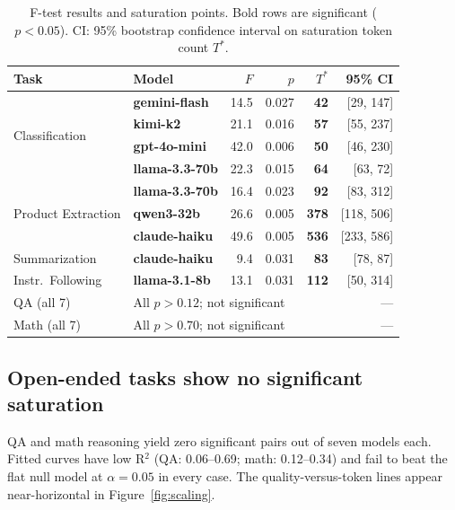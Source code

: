 \begin{table}[t]
\centering
\caption{F-test results and saturation points. Bold rows are significant ($p < 0.05$).
  CI: 95\% bootstrap confidence interval on saturation token count $T^*$.}
\label{tab:ftest}
\small
\begin{tabular}{llrrrr}
\toprule
Task & Model & $F$ & $p$ & $T^*$ & 95\% CI \\
\midrule
\multirow{4}{*}{Classification}
  & \textbf{gemini-flash}  & 14.5 & 0.027 & \textbf{42}  & [29, 147]  \\
  & \textbf{kimi-k2}       & 21.1 & 0.016 & \textbf{57}  & [55, 237]  \\
  & \textbf{gpt-4o-mini}   & 42.0 & 0.006 & \textbf{50}  & [46, 230]  \\
  & \textbf{llama-3.3-70b} & 22.3 & 0.015 & \textbf{64}  & [63, 72]   \\
\midrule
\multirow{3}{*}{Product Extraction}
  & \textbf{llama-3.3-70b} & 16.4 & 0.023 & \textbf{92}  & [83, 312]  \\
  & \textbf{qwen3-32b}     & 26.6 & 0.005 & \textbf{378} & [118, 506] \\
  & \textbf{claude-haiku}  & 49.6 & 0.005 & \textbf{536} & [233, 586] \\
\midrule
Summarization      & \textbf{claude-haiku}  &  9.4 & 0.031 & \textbf{83}  & [78, 87]   \\
Instr.\ Following  & \textbf{llama-3.1-8b}  & 13.1 & 0.031 & \textbf{112} & [50, 314]  \\
\midrule
QA (all 7)   & \multicolumn{4}{l}{All $p > 0.12$; not significant}      & ---        \\
Math (all 7) & \multicolumn{4}{l}{All $p > 0.70$; not significant}      & ---        \\
\bottomrule
\end{tabular}
\end{table}

\subsection{Open-ended tasks show no significant saturation}
\label{sec:result-open}

QA and math reasoning yield zero significant pairs out of seven models each.
Fitted curves have low R$^2$ (QA: 0.06--0.69; math: 0.12--0.34) and fail to
beat the flat null model at $\alpha = 0.05$ in every case.
The quality-versus-token lines appear near-horizontal in
Figure~\ref{fig:scaling}.

